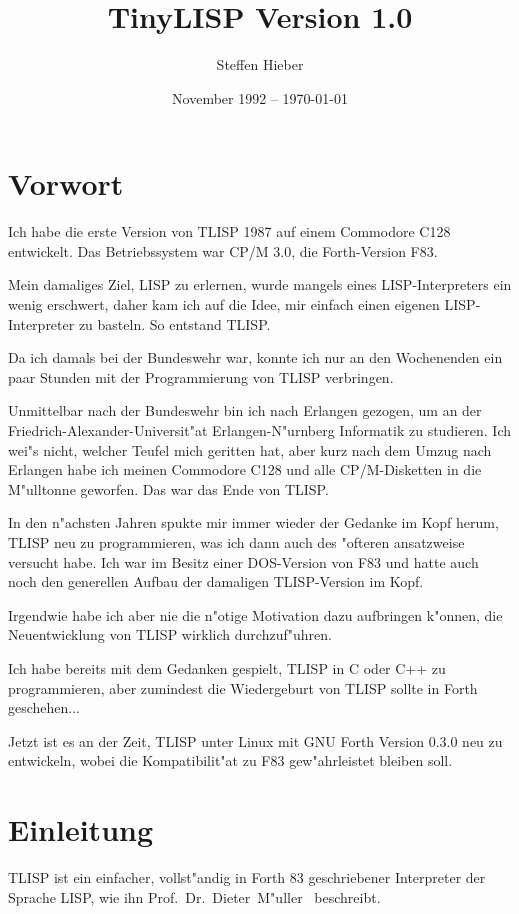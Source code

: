 \documentclass[11pt,a4paper,titlepage]{article}
\title{TinyLISP Version 1.0}
\author{Steffen Hieber}
\date{November 1992 -- \today}
\begin{document}
\maketitle
\tableofcontents
\newpage

\section{Vorwort}
Ich habe die erste Version von TLISP 1987 auf einem Commodore C128 entwickelt.
Das Betriebssystem war CP/M 3.0, die Forth-Version F83.

Mein damaliges Ziel, LISP zu erlernen, wurde mangels eines LISP-Interpreters
ein wenig erschwert, daher kam ich auf die Idee, mir einfach einen eigenen
LISP-Interpreter zu basteln. So entstand TLISP.

Da ich damals bei der Bundeswehr war, konnte ich nur an den Wochenenden ein
paar Stunden mit der Programmierung von TLISP verbringen.

Unmittelbar nach der Bundeswehr bin ich nach Erlangen gezogen, um an der
Friedrich-Alexander-Universit"at Erlangen-N"urnberg Informatik zu studieren.
Ich wei"s nicht, welcher Teufel mich geritten hat, aber kurz nach dem Umzug
nach Erlangen habe ich meinen Commodore C128 und alle CP/M-Disketten in die
M"ulltonne geworfen. Das war das Ende von TLISP.

In den n"achsten Jahren spukte mir immer wieder der Gedanke im Kopf herum,
TLISP neu zu programmieren, was ich dann auch des "ofteren ansatzweise
versucht habe. Ich war im Besitz einer DOS-Version von F83 und hatte auch
noch den generellen Aufbau der damaligen TLISP-Version im Kopf.

Irgendwie habe ich aber nie die n"otige Motivation dazu aufbringen k"onnen,
die Neuentwicklung von TLISP wirklich durchzuf"uhren.

Ich habe bereits mit dem Gedanken gespielt, TLISP in C oder C++ zu
programmieren, aber zumindest die Wiedergeburt von TLISP sollte in Forth
geschehen...

Jetzt ist es an der Zeit, TLISP unter Linux mit GNU Forth Version 0.3.0
neu zu entwickeln, wobei die Kompatibilit"at zu F83 gew"ahrleistet bleiben
soll.

\section{Einleitung}
TLISP ist ein einfacher, vollst"andig in Forth 83 geschriebener Interpreter
der Sprache LISP, wie ihn Prof.~Dr.~Dieter~M"uller~\cite{mu} beschreibt.
\end{document}
